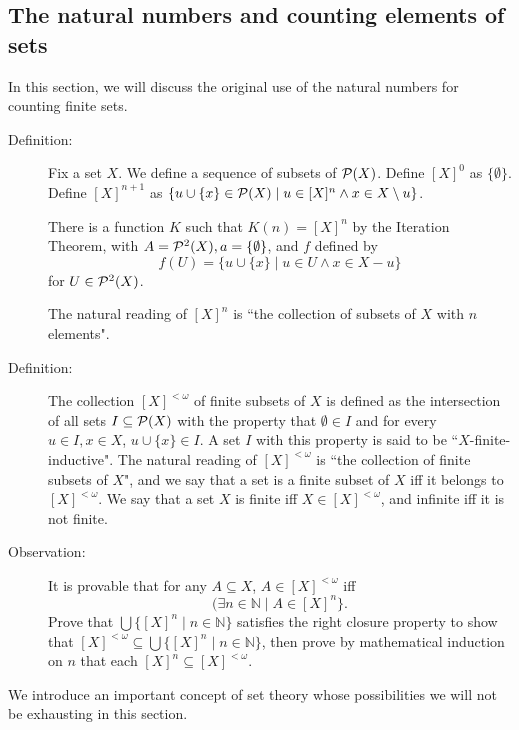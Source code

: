 \documentclass[12pt]{book}
\begin{document}
\newpage

\subsection{The natural numbers and counting elements of sets}

In this section, we will discuss the original use of the natural numbers for counting finite sets.

\begin{description}

\item[Definition:]  Fix a set $X$.  We define a sequence of subsets of ${\cal P}(X)$.  Define $[X]^0$ as $\{\emptyset\}$.  Define $[X]^{n+1}$ as $\{u \cup \{x\} \in {\cal P}(X)\mid u \in [X]^n \wedge x \in X \setminus u\}$.  

There is a function $K$ such that $K(n) = [X]^n$ by the Iteration Theorem, with $A = {\cal P}^2(X), a=\{\emptyset\}$, and $f$ defined by $$f(U) =  \{u \cup \{x\} \mid u \in U \wedge x \in X - u\}$$ for $U \in {\cal P}^2(X)$.

The natural reading of $[X]^n$ is ``the collection of subsets of $X$ with $n$ elements".

\item[Definition:]  The collection $[X]^{<\omega}$ of finite subsets of $X$ is defined as the intersection of all sets $I \subseteq {\cal P}(X)$ with the property that $\emptyset \in I$
and for every $u \in I, x \in X$, $u \cup \{x\}\in I$.  A set $I$ with this property is said to be ``$X$-finite-inductive".  The natural reading of $[X]^{<\omega}$ is ``the collection of finite subsets of $X$", and we say that a set is a finite subset of $X$
iff it belongs to  $[X]^{<\omega}$.  We say that a set $X$ is finite iff $X \in [X]^{<\omega}$, and infinite iff it is not finite.

\item[Observation:]  It is provable that for any $A \subseteq X$, $A \in [X]^{<\omega}$ iff $$(\exists n \in {\mathbb N}\mid A \in [X]^n\}.$$ Prove that $\bigcup \{[X]^n\mid n \in \mathbb N\}$ satisfies the right closure property to show that $[X]^{<\omega} \subseteq \bigcup \{[X]^n\mid n \in \mathbb N\}$, then prove by mathematical induction on $n$ that
each $[X]^n \subseteq [X]^{<\omega}$.

\end{description}

We introduce an important concept of set theory whose possibilities we will not be exhausting in this section.
\end{document}
